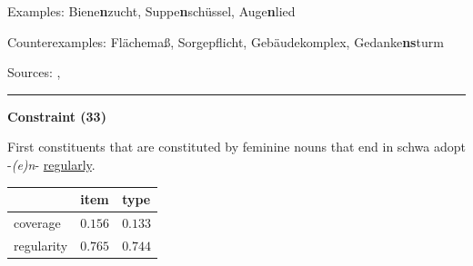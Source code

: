 \vspace{0.3em}

\noindent
Examples: Biene\textbf{n}zucht, Suppe\textbf{n}schüssel, Auge\textbf{n}lied

\noindent
Counterexamples: Fläche{\zeroLinker}maß, Sorge{\zeroLinker}pflicht, Gebäude{\zeroLinker}komplex, Gedanke\textbf{ns}turm

\vspace{0.3em}

\noindent
Sources: \citet[18]{kuerschner_2010}, \citet[83, 92]{ortner_mueller-bollhagen_1991}


\hrule




\vspace{0.4em}

\begin{center}
\textbf{Constraint (33)}
\end{center}

\noindent
First constituents that are constituted by feminine nouns that end in schwa adopt -\textit{(e)n}- \underline{regularly}.
\vspace{0.35em}


\vspace{-0.35em}

\begin{table}[!ht]
\begin{center}

\begin{tabularx}{\columnwidth}{|X|X|X|}
\hline
 & item & type \\
\hline
 coverage & $0.156$ & $0.133$ \\
\hline
 regularity & $0.765$ & $0.744$ \\
\hline
\end{tabularx}
\end{center}
\end{table}

\vspace{-1.35em}

